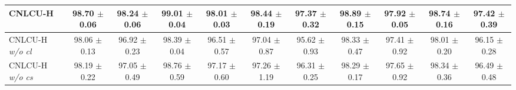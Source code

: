 \documentclass[11pt]{article}
\begin{document}
\begin{table}[!htbp]
\begin{tabular}{l |cc|cc|cc|cc|cc}
			\hline
			CNLCU-H & \makecell{98.70\\ $\pm$\scriptsize{0.06}} & \makecell{98.24\\ $\pm$\scriptsize{0.06}} & \makecell{99.01\\ $\pm$\scriptsize{0.04}} & \makecell{98.01\\ $\pm$\scriptsize{0.03}} & \makecell{98.44\\ $\pm$\scriptsize{0.19}} & \makecell{97.37\\ $\pm$\scriptsize{0.32}} & \makecell{98.89\\ $\pm$\scriptsize{0.15}} & \makecell{97.92\\ $\pm$\scriptsize{0.05}} & \makecell{98.74\\ $\pm$\scriptsize{0.16}} & \makecell{97.42\\ $\pm$\scriptsize{0.39}}	\\\hline
			CNLCU-H \textit{w/o cl} & \makecell{98.06\\ $\pm$\scriptsize{0.13}} & \makecell{96.92\\ $\pm$\scriptsize{0.23}} & \makecell{98.39\\ $\pm$\scriptsize{0.04}} & \makecell{96.51\\ $\pm$\scriptsize{0.57}} & \makecell{97.04\\ $\pm$\scriptsize{0.87}} & \makecell{95.62\\ $\pm$\scriptsize{0.93}} & \makecell{98.33\\ $\pm$\scriptsize{0.47}} & \makecell{97.41\\ $\pm$\scriptsize{0.92}} & \makecell{98.01\\ $\pm$\scriptsize{0.20}} & \makecell{96.15\\ $\pm$\scriptsize{0.28}}	\\	  \hline
			CNLCU-H \textit{w/o cs} & \makecell{98.19\\ $\pm$\scriptsize{0.22}} & \makecell{97.05\\ $\pm$\scriptsize{0.49}} & \makecell{98.76\\ $\pm$\scriptsize{0.59}} & \makecell{97.17\\ $\pm$\scriptsize{0.60}} & \makecell{97.26\\ $\pm$\scriptsize{1.19}} & \makecell{96.31\\ $\pm$\scriptsize{0.25}} & \makecell{98.29\\ $\pm$\scriptsize{0.17}} & \makecell{97.65\\ $\pm$\scriptsize{0.92}} & \makecell{98.34\\ $\pm$\scriptsize{0.36}} & \makecell{96.49\\ $\pm$\scriptsize{0.48}}\\	 \hline

\end{tabular}
\end{table}
\end{document}
